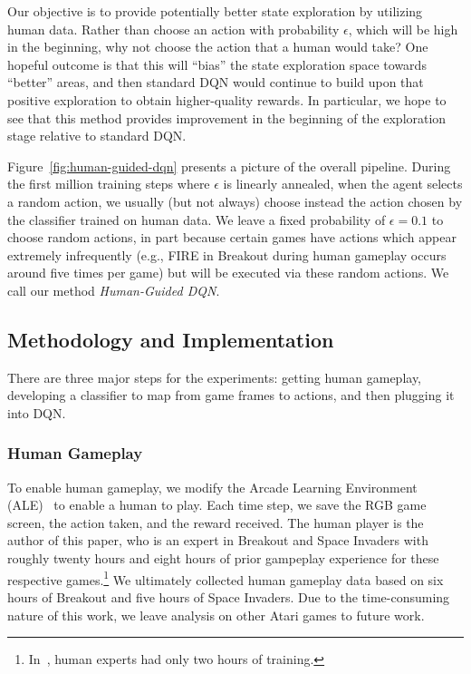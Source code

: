 \documentclass[letterpaper, 10pt, conference]{ieeeconf}
\begin{document}
Our objective is to provide potentially better state exploration by utilizing
human data. Rather than choose an action with probability $\epsilon$, which will
be high in the beginning, why not choose the action that a human would take? One
hopeful outcome is that this will ``bias'' the state exploration space towards
``better'' areas, and then standard DQN would continue to build upon that
positive exploration to obtain higher-quality rewards. In particular, we hope to
see that this method provides improvement in the beginning of the exploration
stage relative to standard DQN.

Figure~\ref{fig:human-guided-dqn} presents a picture of the overall pipeline.
During the first million training steps where $\epsilon$ is linearly annealed,
when the agent selects a random action, we usually (but not always) choose
instead the action chosen by the classifier trained on human data. We leave a
fixed probability of $\epsilon=0.1$ to choose random actions, in part because
certain games have actions which appear extremely infrequently (e.g., FIRE in
Breakout during human gameplay occurs around five times per game) but will be
executed via these random actions. We call our method \emph{Human-Guided DQN}.

\subsection{Methodology and Implementation}\label{ssec:implementation}

There are three major steps for the experiments: getting human gameplay,
developing a classifier to map from game frames to actions, and then plugging it
into DQN. 

\subsubsection{Human Gameplay} To enable human gameplay, we modify the Arcade
Learning Environment (ALE)~\cite{bellemare13arcade} to enable a human to play.
Each time step, we save the RGB game screen, the action taken, and the reward
received. The human player is the author of this paper, who is an expert in
Breakout and Space Invaders with roughly twenty hours and eight hours of prior
gampeplay experience for these respective
games.\footnote{In~\cite{mnih-dqn-2015}, human experts had only two hours of
training.} We ultimately collected human gameplay data based on six hours of
Breakout and five hours of Space Invaders. Due to the time-consuming nature of
this work, we leave analysis on other Atari games to future work.
\end{document}
